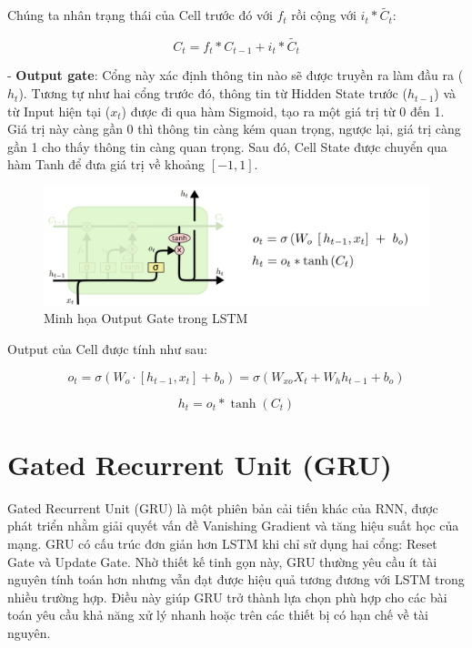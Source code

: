 Chúng ta nhân trạng thái của Cell trước đó với \(f_t\) rồi cộng với \(i_t * \tilde{C_t}\):

\begin{equation*}
    C_t = f_t * C_{t-1} + i_t * \tilde{C_t}
\end{equation*}

- \textbf{Output gate}: Cổng này xác định thông tin nào sẽ được truyền ra làm đầu ra (\(h_t\)). Tương tự như hai cổng trước đó, thông tin từ Hidden State trước (\(h_{t-1}\)) và từ Input hiện tại (\(x_t\)) được đi qua hàm Sigmoid, tạo ra một giá trị từ 0 đến 1. Giá trị này càng gần 0 thì thông tin càng kém quan trọng, ngược lại, giá trị càng gần 1 cho thấy thông tin càng quan trọng. Sau đó, Cell State được chuyển qua hàm Tanh để đưa giá trị về khoảng \([-1, 1]\).

\begin{figure}[h!]
    \centering
    \includegraphics[width=\textwidth]{images/LSTM/lstm-output-o.png}
    \caption{Minh họa Output Gate trong LSTM}
    \label{fig:lstm_output_gate}
\end{figure}

Output của Cell được tính như sau:

\begin{equation*}
    o_t = \sigma \left( W_o \cdot [h_{t-1}, x_t] + b_o \right) = \sigma (W_{xo} X_t + W_h h_{t-1} + b_o)
\end{equation*}

\begin{equation*}
    h_t = o_t * \tanh (C_t)
\end{equation*}

\section{Gated Recurrent Unit (GRU)}
Gated Recurrent Unit (GRU) là một phiên bản cải tiến khác của RNN, được phát triển nhằm giải quyết vấn đề Vanishing Gradient và tăng hiệu suất học của mạng. GRU có cấu trúc đơn giản hơn LSTM khi chỉ sử dụng hai cổng: Reset Gate và Update Gate. Nhờ thiết kế tinh gọn này, GRU thường yêu cầu ít tài nguyên tính toán hơn nhưng vẫn đạt được hiệu quả tương đương với LSTM trong nhiều trường hợp. Điều này giúp GRU trở thành lựa chọn phù hợp cho các bài toán yêu cầu khả năng xử lý nhanh hoặc trên các thiết bị có hạn chế về tài nguyên.

